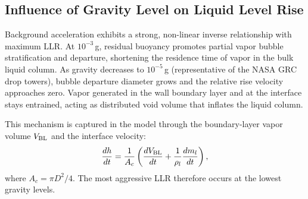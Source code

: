 \documentclass[conf]{new-aiaa}
\begin{document}



\subsection{Influence of Gravity Level on Liquid Level Rise}
Background acceleration exhibits a strong, non-linear inverse relationship with maximum LLR. At $10^{-3}\,$g, residual buoyancy promotes partial vapor bubble stratification and departure, shortening the residence time of vapor in the bulk liquid column. As gravity decreases to $10^{-5}\,$g (representative of the NASA GRC drop towers), bubble departure diameter grows and the relative rise velocity approaches zero. Vapor generated in the wall boundary layer and at the interface stays entrained, acting as distributed void volume that inflates the liquid column.

This mechanism is captured in the model through the boundary-layer vapor volume $V_{\rm BL}$ and the interface velocity:
\[
\frac{dh}{dt} = \frac{1}{A_c}\left(\frac{dV_{\rm BL}}{dt} + \frac{1}{\rho_l}\frac{dm_l}{dt}\right),
\]
where $A_c = \pi D^2/4$. The most aggressive LLR therefore occurs at the lowest gravity levels.
\end{document}
